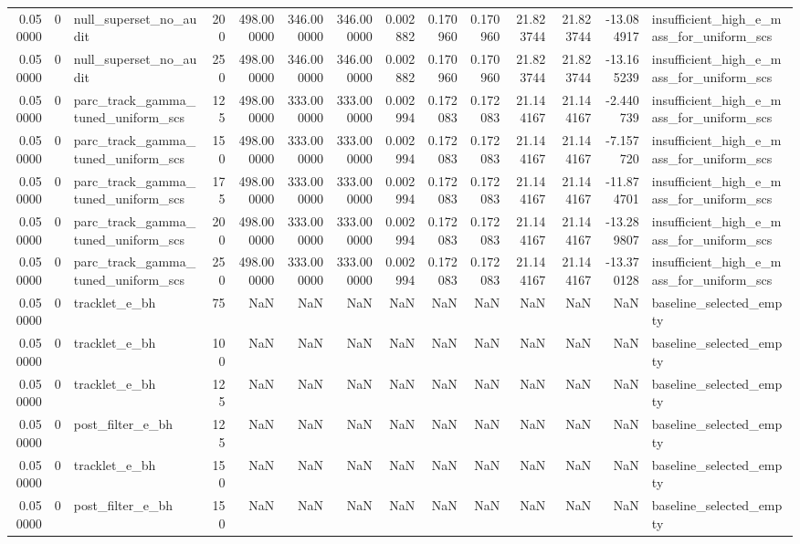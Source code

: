 \begin{tabular}{rrlrrrrrrrrrrl}
0.050000 & 0 & null_superset_no_audit & 200 & 498.000000 & 346.000000 & 346.000000 & 0.002882 & 0.170960 & 0.170960 & 21.823744 & 21.823744 & -13.084917 & insufficient_high_e_mass_for_uniform_scs \\
0.050000 & 0 & null_superset_no_audit & 250 & 498.000000 & 346.000000 & 346.000000 & 0.002882 & 0.170960 & 0.170960 & 21.823744 & 21.823744 & -13.165239 & insufficient_high_e_mass_for_uniform_scs \\
0.050000 & 0 & parc_track_gamma_tuned_uniform_scs & 125 & 498.000000 & 333.000000 & 333.000000 & 0.002994 & 0.172083 & 0.172083 & 21.144167 & 21.144167 & -2.440739 & insufficient_high_e_mass_for_uniform_scs \\
0.050000 & 0 & parc_track_gamma_tuned_uniform_scs & 150 & 498.000000 & 333.000000 & 333.000000 & 0.002994 & 0.172083 & 0.172083 & 21.144167 & 21.144167 & -7.157720 & insufficient_high_e_mass_for_uniform_scs \\
0.050000 & 0 & parc_track_gamma_tuned_uniform_scs & 175 & 498.000000 & 333.000000 & 333.000000 & 0.002994 & 0.172083 & 0.172083 & 21.144167 & 21.144167 & -11.874701 & insufficient_high_e_mass_for_uniform_scs \\
0.050000 & 0 & parc_track_gamma_tuned_uniform_scs & 200 & 498.000000 & 333.000000 & 333.000000 & 0.002994 & 0.172083 & 0.172083 & 21.144167 & 21.144167 & -13.289807 & insufficient_high_e_mass_for_uniform_scs \\
0.050000 & 0 & parc_track_gamma_tuned_uniform_scs & 250 & 498.000000 & 333.000000 & 333.000000 & 0.002994 & 0.172083 & 0.172083 & 21.144167 & 21.144167 & -13.370128 & insufficient_high_e_mass_for_uniform_scs \\
0.050000 & 0 & tracklet_e_bh & 75 & NaN & NaN & NaN & NaN & NaN & NaN & NaN & NaN & NaN & baseline_selected_empty \\
0.050000 & 0 & tracklet_e_bh & 100 & NaN & NaN & NaN & NaN & NaN & NaN & NaN & NaN & NaN & baseline_selected_empty \\
0.050000 & 0 & tracklet_e_bh & 125 & NaN & NaN & NaN & NaN & NaN & NaN & NaN & NaN & NaN & baseline_selected_empty \\
0.050000 & 0 & post_filter_e_bh & 125 & NaN & NaN & NaN & NaN & NaN & NaN & NaN & NaN & NaN & baseline_selected_empty \\
0.050000 & 0 & tracklet_e_bh & 150 & NaN & NaN & NaN & NaN & NaN & NaN & NaN & NaN & NaN & baseline_selected_empty \\
0.050000 & 0 & post_filter_e_bh & 150 & NaN & NaN & NaN & NaN & NaN & NaN & NaN & NaN & NaN & baseline_selected_empty \\

\end{tabular}
